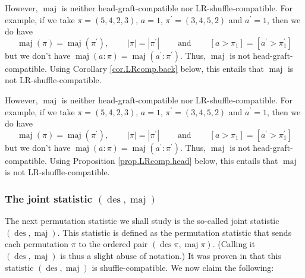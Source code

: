 \documentclass[numbers=enddot,12pt,final,onecolumn,notitlepage]{scrartcl}%
\theoremstyle{definition}
\newenvironment{verlong}{}{}
\newenvironment{vershort}{}{}
\begin{document}
\begin{vershort}
However, $\operatorname*{maj}$ is neither head-graft-compatible nor
LR-shuffle-compatible. For example, if we take $\pi=\left(  5,4,2,3\right)  $,
$a=1$, $\pi^{\prime}=\left(  3,4,5,2\right)  $ and $a^{\prime}=1$, then we do
have%
\[
\operatorname*{maj}\left(  \pi\right)  =\operatorname*{maj}\left(  \pi
^{\prime}\right)  ,\ \ \ \ \ \ \ \ \ \ \left\vert \pi\right\vert =\left\vert
\pi^{\prime}\right\vert \ \ \ \ \ \ \ \ \ \ \text{and}%
\ \ \ \ \ \ \ \ \ \ \left[  a>\pi_{1}\right]  =\left[  a^{\prime}>\pi
_{1}^{\prime}\right]
\]
but we don't have $\operatorname*{maj}\left(  a:\pi\right)
=\operatorname*{maj}\left(  a^{\prime}:\pi^{\prime}\right)  $. Thus,
$\operatorname*{maj}$ is not head-graft-compatible. Using Corollary
\ref{cor.LRcomp.back} below, this entails that
$\operatorname*{maj}$ is not LR-shuffle-compatible.
\end{vershort}

\begin{verlong}
However, $\operatorname*{maj}$ is neither head-graft-compatible nor
LR-shuffle-compatible. For example, if we take $\pi=\left(  5,4,2,3\right)  $,
$a=1$, $\pi^{\prime}=\left(  3,4,5,2\right)  $ and $a^{\prime}=1$, then we do
have%
\[
\operatorname*{maj}\left(  \pi\right)  =\operatorname*{maj}\left(  \pi
^{\prime}\right)  ,\ \ \ \ \ \ \ \ \ \ \left\vert \pi\right\vert =\left\vert
\pi^{\prime}\right\vert \ \ \ \ \ \ \ \ \ \ \text{and}%
\ \ \ \ \ \ \ \ \ \ \left[  a>\pi_{1}\right]  =\left[  a^{\prime}>\pi
_{1}^{\prime}\right]
\]
but we don't have $\operatorname*{maj}\left(  a:\pi\right)
=\operatorname*{maj}\left(  a^{\prime}:\pi^{\prime}\right)  $. Thus,
$\operatorname*{maj}$ is not head-graft-compatible. Using Proposition
\ref{prop.LRcomp.head} below, this entails that $\operatorname*{maj}$ is not LR-shuffle-compatible.
\end{verlong}

\subsubsection{The joint statistic $\left(  \operatorname*{des}%
,\operatorname*{maj}\right)  $}

The next permutation statistic we shall study is the so-called joint statistic
$\left(  \operatorname*{des},\operatorname*{maj}\right)  $. This statistic is
defined as the permutation statistic that sends each permutation $\pi$ to the
ordered pair $\left(  \operatorname*{des}\pi,\operatorname*{maj}\pi\right)  $.
(Calling it $\left(  \operatorname*{des},\operatorname*{maj}\right)  $ is thus
a slight abuse of notation.) It was proven in \cite[Theorem 4.5 \textbf{(a)}%
]{part1} that this statistic $\left(  \operatorname*{des},\operatorname*{maj}%
\right)  $ is shuffle-compatible. We now claim the following:
\end{document}
